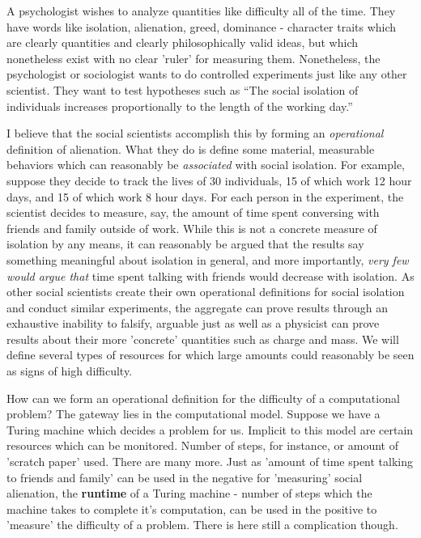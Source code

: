 A psychologist wishes to analyze quantities like difficulty all of the time. They have words like isolation, alienation, greed, dominance - character traits which are clearly quantities and clearly philosophically valid ideas, but which nonetheless exist with no clear 'ruler' for measuring them. Nonetheless, the psychologist or sociologist wants to do controlled experiments just like any other scientist. They want to test hypotheses such as ``The social isolation of individuals increases proportionally to the length of the working day.''

I believe that the social scientists accomplish this by forming an \textit{operational} definition of alienation. What they do is define some material, measurable behaviors which can reasonably be \textit{associated} with social isolation. For example, suppose they decide to track the lives of 30 individuals, 15 of which work 12 hour days, and 15 of which work 8 hour days. For each person in the experiment, the scientist decides to measure, say, the amount of time spent conversing with friends and family outside of work. While this is not a concrete measure of isolation by any means, it can reasonably be argued that the results say something meaningful about isolation in general, and more importantly, \textit{very few would argue that} time spent talking with friends would decrease with isolation. As other social scientists create their own operational definitions for social isolation and conduct similar experiments, the aggregate can prove results through an exhaustive inability to falsify, arguable just as well as a physicist can prove results about their more 'concrete' quantities such as charge and mass. We will define several types of resources for which large amounts could reasonably be seen as signs of high difficulty. 

How can we form an operational definition for the difficulty of a computational problem? The gateway lies in the computational model. Suppose we have a Turing machine which decides a problem for us. Implicit to this model are certain resources which can be monitored. Number of steps, for instance, or amount of 'scratch paper' used. There are many more. Just as 'amount of time spent talking to friends and family' can be used in the negative for 'measuring' social alienation, the \textbf{runtime} of a Turing machine - number of steps which the machine takes to complete it's computation, can be used in the positive to 'measure' the difficulty of a problem. There is here still a complication though. 

